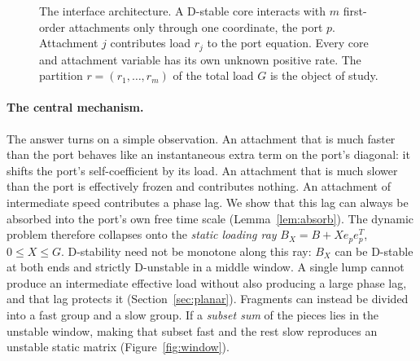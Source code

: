\documentclass[11pt,a4paper]{article}
\theoremstyle{plain}
\theoremstyle{definition}
\theoremstyle{remark}
\begin{document}
\begin{figure}[t]
\centering
{}
\caption{The interface architecture. A D-stable core interacts with $m$
first-order attachments only through one coordinate, the port $p$. Attachment
$j$ contributes load $r_j$ to the port equation. Every core and attachment
variable has its own unknown positive rate. The partition
$r=(r_1,\dots,r_m)$ of the total load $G$ is the object of study.}
\label{fig:schematic}
\end{figure}

\paragraph{The central mechanism.}
The answer turns on a simple observation. An attachment that is much faster
than the port behaves like an instantaneous extra term on the port's diagonal:
it shifts the port's self-coefficient by its load. An attachment that is much
slower than the port is effectively frozen and contributes nothing. An
attachment of intermediate speed contributes a phase lag. We show that this
lag can always be absorbed into the port's own free time scale
(Lemma~\ref{lem:absorb}). The dynamic problem therefore collapses onto the
\emph{static loading ray} $B_X=B+Xe_pe_p^{T}$, $0\le X\le G$. D-stability need
not be monotone along this ray: $B_X$ can be D-stable at both ends and strictly
D-unstable in a middle window. A single lump cannot produce an intermediate
effective load without also producing a large phase lag, and that lag protects
it (Section~\ref{sec:planar}). Fragments can instead be divided into a fast
group and a slow group. If a \emph{subset sum} of the pieces lies in the
unstable window, making that subset fast and the rest slow reproduces an
unstable static matrix (Figure~\ref{fig:window}).
\end{document}
